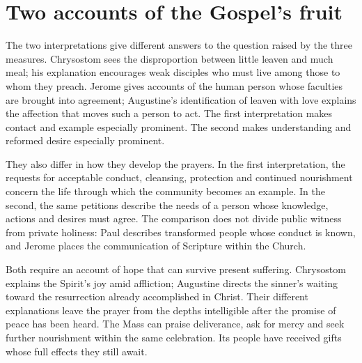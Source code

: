 \section{Two accounts of the Gospel's fruit}

The two interpretations give different answers to the question raised by the three measures. Chrysostom sees the disproportion between little leaven and much meal; his explanation encourages weak disciples who must live among those to whom they preach. Jerome gives accounts of the human person whose faculties are brought into agreement; Augustine's identification of leaven with love explains the affection that moves such a person to act. The first interpretation makes contact and example especially prominent. The second makes understanding and reformed desire especially prominent.

They also differ in how they develop the prayers. In the first interpretation, the requests for acceptable conduct, cleansing, protection and continued nourishment concern the life through which the community becomes an example. In the second, the same petitions describe the needs of a person whose knowledge, actions and desires must agree. The comparison does not divide public witness from private holiness: Paul describes transformed people whose conduct is known, and Jerome places the communication of Scripture within the Church.

Both require an account of hope that can survive present suffering. Chrysostom explains the Spirit's joy amid affliction; Augustine directs the sinner's waiting toward the resurrection already accomplished in Christ. Their different explanations leave the prayer from the depths intelligible after the promise of peace has been heard. The Mass can praise deliverance, ask for mercy and seek further nourishment within the same celebration. Its people have received gifts whose full effects they still await.
